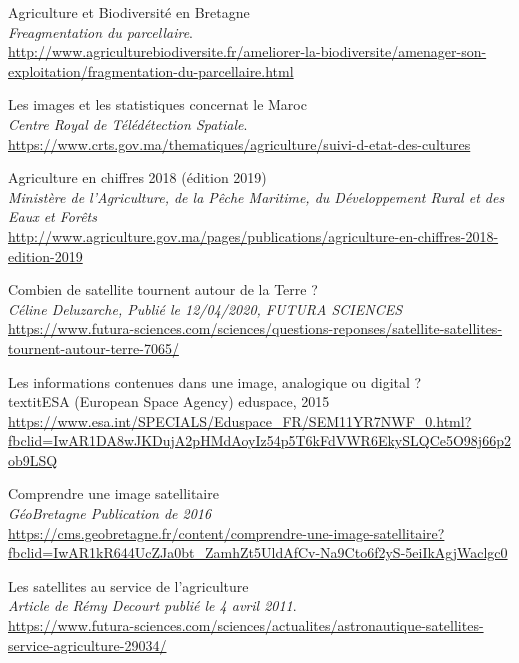 \documentclass[12pt, openany]{report}
\begin{document}

\begin{thebibliography}{9}

Agriculture et Biodiversité en Bretagne\\
\textit{Freagmentation du parcellaire}. \\
\url{http://www.agriculturebiodiversite.fr/ameliorer-la-biodiversite/amenager-son-exploitation/fragmentation-du-parcellaire.html}

Les images et les statistiques concernat le Maroc\\
\textit{Centre Royal de Télédétection Spatiale}.\\
\url{https://www.crts.gov.ma/thematiques/agriculture/suivi-d-etat-des-cultures}

Agriculture en chiffres 2018 (édition 2019)\\
\textit{Ministère de l'Agriculture, de la Pêche Maritime, du Développement Rural et des Eaux et Forêts}\\
\url{http://www.agriculture.gov.ma/pages/publications/agriculture-en-chiffres-2018-edition-2019}

Combien de satellite tournent autour de la Terre ?\\
\textit{Céline Deluzarche, Publié le 12/04/2020, FUTURA SCIENCES}\\
\url{https://www.futura-sciences.com/sciences/questions-reponses/satellite-satellites-tournent-autour-terre-7065/}

Les informations contenues dans une image, analogique ou digital ?\\
textit{ESA (European Space Agency) eduspace, 2015}\\
\url{https://www.esa.int/SPECIALS/Eduspace_FR/SEM11YR7NWF_0.html?fbclid=IwAR1DA8wJKDujA2pHMdAoyIz54p5T6kFdVWR6EkySLQCe5O98j66p2ob9LSQ}

Comprendre une image satellitaire\\
\textit{GéoBretagne Publication de 2016}\\
\url{https://cms.geobretagne.fr/content/comprendre-une-image-satellitaire?fbclid=IwAR1kR644UcZJa0bt_ZamhZt5UldAfCv-Na9Cto6f2yS-5eiIkAgjWaclgc0}

Les satellites au service de l'agriculture\\
\textit{Article de Rémy Decourt publié le 4 avril 2011}.\\
\url{https://www.futura-sciences.com/sciences/actualites/astronautique-satellites-service-agriculture-29034/}


\end{thebibliography}
\end{document}

